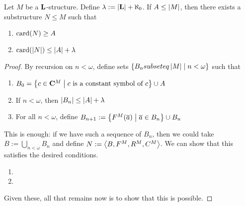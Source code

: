 \begin{boxtheorem}
    Let $M$ be a $\mathbf{L}$-structure. Define $\lambda := \left\lvert \mathbf{L} \right\rvert + \aleph_{0}$. If $A \leq \left\lvert M \right\rvert$, then there exists a substructure $N \leq M$ such that
    \begin{enumerate}[label = (\alph*)]
        \item $\operatorname{card}\!\left( N \right) \geq A$
        \item $\operatorname{card}\!\left( \left\lvert N \right\rvert \right) \leq \left\lvert A \right\rvert + \lambda$
    \end{enumerate}
\end{boxtheorem}
\begin{proof}
    By recursion on $n < \omega$, define sets $\left\{ B_{n} subseteq \left\lvert M \right\rvert \; \middle\vert \; n < \omega \right\}$ such that
    \begin{enumerate}
        \item $B_{0} = \left\{ c \in \mathbf{C}^M \; \middle\vert \; c \text{ is a constant symbol of } c \right\} \cup A$
        \item If $n < \omega$, then $\left\lvert B_n \right\rvert \leq \left\lvert A \right\rvert + \lambda$
        \item For all $n < \omega$, define $B_{n+1} := \left\{ F^M\!\left( \overline{a} \right) \; \middle\vert \; \overline{a} \in B_{n} \right\} \cup B_n$
    \end{enumerate}
    This is enough: if we have such a sequence of $B_n$, then we could take $B := \bigcup_{n < \omega} B_n$ and define $N := \left\langle B, F^M, R^M, C^M \right\rangle$. We can show that this satisfies the desired conditions.
    \begin{enumerate}[label = (\alph*)]
        \item \sorry
        \item \sorry
    \end{enumerate}

    Given these, all that remains now is to show that this is possible. \sorry{}
\end{proof}